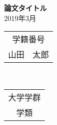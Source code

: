 \documentclass[a4j,12pt]{jreportTsukuba}
\newcommand{\dg}{\gt}
\renewcommand{\baselinestretch}{1.1}
\begin{document}
\begin{titlepage}
\begin{huge}
\begin{center}
\vspace*{4cm}
{\huge {\bf 論文タイトル}}%
\vspace{4cm}\\
2019年3月
\vspace{2cm}\\
\begin{tabular}{c}
学籍番号\\
山田　太郎
\end{tabular}
\vspace{2cm}\\
\begin{tabular}{c}
大学学群\\
学類
\end{tabular}
\end{center}
\end{huge}
\end{titlepage}

\renewcommand{\bibname}{参考文献}

\setlength{\baselineskip}{20pt}
%
\tableofcontents
\listoftables
\listoffigures

\cleardoublepage
{}








\appendix %
%
%
%
\end{document}
